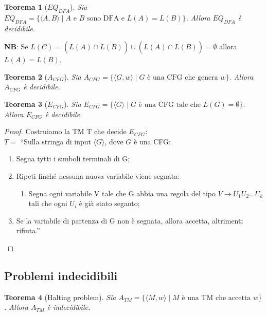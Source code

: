 \documentclass[11pt]{article}
\newtheorem{theorem}{Teorema}[section]
\newtheorem{proof}{Dimostrazione}[section]
\begin{document}
\begin{theorem}[$EQ_{DFA}$]
	Sia $EQ_{DFA} = \{\langle A, B \rangle \mid A \text{ e } B \text{ sono DFA e }
	L(A) = L(B)\}$. Allora $EQ_{DFA}$ è decidibile.
\end{theorem}

\textbf{NB}: Se $L(C) = (L(A) \cap \overline{L(B)}) \cup (\overline{L(A)} \cap
L(B)) = \emptyset$ allora $L(A) = L(B)$.

\begin{theorem}[$A_{CFG}$]
	Sia $A_{CFG} = \{\langle G, w \rangle \mid G \text{ è una CFG che genera } 
	w\}$. Allora $A_{CFG}$ è decidibile.
\end{theorem}

\begin{theorem}[$E_{CFG}$]
	Sia $E_{CFG} = \{\langle G \rangle \mid G \text{ è una CFG tale che } L(G) = 
	\emptyset\}$. Allora $E_{CFG}$ è decidibile.
\end{theorem}

\begin{proof}
Costruiamo la TM T che decide $E_{CFG}$:\\

$T = $ ``Sulla stringa di input $\langle G \rangle$, dove $G$ è una CFG:
\begin{enumerate}
	\item Segna tytti i simboli terminali di G;
	\item Ripeti finché nessuna nuova variabile viene segnata:
	\begin{enumerate}
		\item Segna ogni variabile V tale che G abbia una regola del tipo $V 
			\rightarrow U_1 U_2 \dots U_k$ tali che ogni $U_i$ è già stato
			seganto;
	\end{enumerate}
	\item Se la variabile di partenza di G non è segnata, allora accetta, 
		altrimenti rifiuta.''
\end{enumerate}
\end{proof}

\subsection{Problemi indecidibili}

\begin{theorem}[Halting problem]
	Sia $A_{TM} = \{\langle M, w \rangle \mid M \text{ è una TM che accetta } 
	w\}$. Allora $A_{TM}$ è indecidibile.
\end{theorem}
\end{document}
